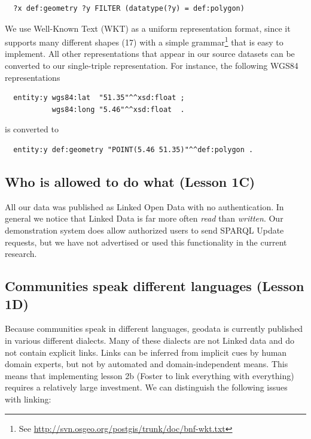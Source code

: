 \documentclass[a4paper]{scrartcl}
\newcommand{\seeUrl}[1]{\footnote{See \mbox{\url{#1}}}}
\begin{document}
\begin{verbatim}
  ?x def:geometry ?y FILTER (datatype(?y) = def:polygon)
\end{verbatim}

We use Well-Known Text (WKT) as a uniform representation format, since
it supports many different shapes (17) with a simple
grammar\seeUrl{http://svn.osgeo.org/postgis/trunk/doc/bnf-wkt.txt}
that is easy to implement.  All other representations that appear in
our source datasets can be converted to our single-triple
representation.  For instance, the following WGS84 representations

\begin{verbatim}
  entity:y wgs84:lat  "51.35"^^xsd:float ;
           wgs84:long "5.46"^^xsd:float  .
\end{verbatim}

is converted to

\begin{verbatim}
  entity:y def:geometry "POINT(5.46 51.35)"^^def:polygon .
\end{verbatim} 


\subsection{Who is allowed to do what (Lesson 1C)}

All our data was published as Linked Open Data with no authentication.
In general we notice that Linked Data is far more often \emph{read}
than \emph{written}.  Our demonstration system does allow authorized
users to send SPARQL Update requests, but we have not advertised or
used this functionality in the current research.


\subsection{Communities speak different languages (Lesson 1D)}
\label{sec:conversion}
\label{sec:enrichment}
\label{sec:transformation}

Because communities speak in different languages, geodata is currently
published in various different dialects.  Many of these dialects are
not Linked data and do not contain explicit links.  Links can be
inferred from implicit cues by human domain experts, but not by
automated and domain-independent means.  This means that implementing
lesson 2b (Foster to link everything with everything) requires a
relatively large investment.  We can distinguish the following issues
with linking:
\end{document}
